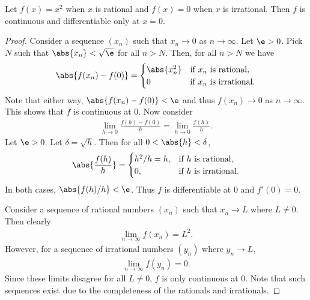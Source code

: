 \documentclass{article}
\begin{document}
\begin{claim}
   Let $f(x)=x^2$ when $x$ is rational and $f(x)=0$ when $x$ is irrational.
   Then $f$ is continuous and differentiable only at $x=0$.
\end{claim}
\begin{proof}
   Consider a sequence $(x_n)$ such that $x_n\to 0$ as $n\to \infty$. Let $\e>0$.
   Pick $N$ such that $\abs{x_n}<\sqrt{\e}$ for all $n>N$. Then, for all $n>N$ we have
   \begin{align*}
      \abs{f(x_n) - f(0)} = \begin{cases}
         \abs{x_n^2} &\text{if $x_n$ is rational},\\
         0           &\text{if $x_n$ is irrational}.
      \end{cases}
   \end{align*}
   Note that either way, $\abs{f(x_n)-f(0)}<\e$ and thus $f(x_n)\to 0$ as $n\to\infty$.
   This shows that $f$ is continuous at $0$. Now consider
   \begin{align*}
      \lim_{h\to 0} \frac{f(h) - f(0)}{h} = \lim_{h\to 0} \frac{f(h)}{h}. 
   \end{align*}
   Let $\e>0$. Let $\delta = \sqrt{h}$. Then for all $0 < \abs{h} < \delta$, 
   \begin{align}
      \abs{\frac{f(h)}{h}} = \begin{cases}
         h^2/h = h, &\text{if $h$ is rational},\\
         0        , &\text{if $h$ is irrational}. 
      \end{cases}
   \end{align}
   In both cases, $\abs{f(h)/h}<\e$. Thus $f$ is differentiable at $0$ and $f'(0)=0$.

   Consider a sequence of rational numbers $(x_n)$ such that $x_n\to L$ where $L\not=0$.
   Then clearly 
   \begin{align}
      \lim_{n\to\infty} f(x_n) = L^2.
   \end{align}
   However, for a sequence of irrational numbers $(y_n)$ where $y_n\to L$,
   \begin{align}
      \lim_{n\to\infty} f(y_n) = 0.
   \end{align}
   Since these limits disagree for all $L\not=0$, $f$ is only continuous at $0$.
   Note that such sequences exist due to the completeness of the rationals and
   irrationals.
\end{proof}
\end{document}
